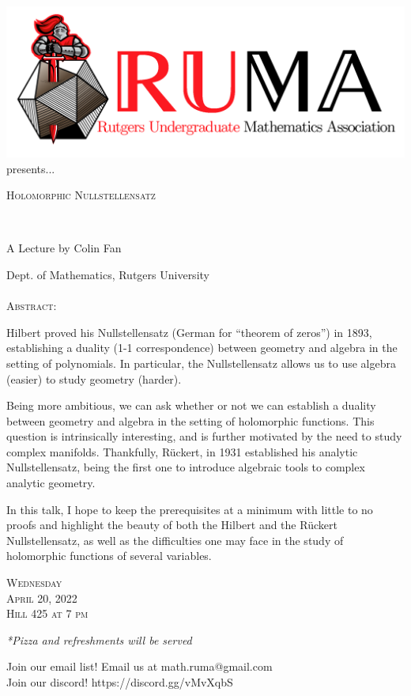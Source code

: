\documentclass[12pt]{article}
\begin{document}

\begin{center}\includegraphics[scale=.45]{RUMAlogo.png}\\
presents... \\
\begin{spacing}{1}
{\fontsize{33}{33}\selectfont  \textsc{Holomorphic Nullstellensatz}} \end{spacing}

 

~~\\
\begin{spacing}{1.5}
{\fontsize{23}{23} \selectfont A Lecture by Colin Fan}  \end{spacing} 
\large Dept. of Mathematics, Rutgers University \\~~\\

\normalsize
\textsc{Abstract:}

\large
Hilbert proved his Nullstellensatz (German for ``theorem of zeros'') in 1893, establishing a duality (1-1 correspondence) between geometry and algebra in the setting of polynomials. In particular, the Nullstellensatz allows us to use algebra (easier) to study geometry (harder). 

Being more ambitious, we can ask whether or not we can establish a duality between geometry and algebra in the setting of holomorphic functions. This question is intrinsically interesting, and is further motivated by the need to study complex manifolds. Thankfully, Rückert, in 1931 established his analytic Nullstellensatz, being the first one to introduce algebraic tools to complex analytic geometry. 

In this talk, I hope to keep the prerequisites at a minimum with little to no proofs and highlight the beauty of both the Hilbert and the Rückert Nullstellensatz, as well as the difficulties one may face in the study of holomorphic functions of several variables. 

\vspace{2mm} 
\huge   \textsc{Wednesday\\April 20, 2022 \\Hill 425 at 7
  pm}

\vspace{2mm}
\large
\emph{*Pizza and refreshments will be served}

  \Large  Join our email list! Email us at
  math.ruma@gmail.com\\Join our discord!
  https://discord.gg/vMvXqbS
\end{center}
\end{document}
